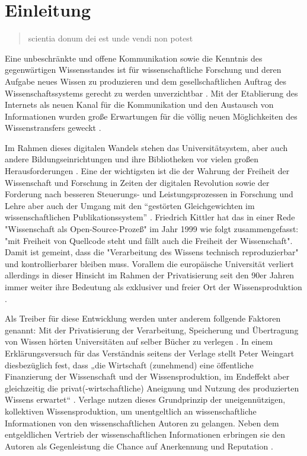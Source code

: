 \chapter{Einleitung} 

\begin{quote}
scientia donum dei est unde vendi non potest
\end{quote}Eine unbeschränkte und offene Kommunikation sowie die Kenntnis des gegenwärtigen Wissensstandes ist für wissenschaftliche Forschung und deren Aufgabe neues Wissen zu produzieren und dem gesellschaftlichen Auftrag des Wissenschaftssystems gerecht zu werden unverzichtbar \cite{Hanekop_2014} \cite{glaeser2006} \cite{gibbons_1994} \cite{Luhmann1998}. Mit der Etablierung des Internets als neuen Kanal für die Kommunikation und den Austausch von Informationen wurden große Erwartungen für die völlig neuen Möglichkeiten des Wissenstransfers geweckt \cite{Hanekop_2014} \cite{albert_2006_open_implications} \cite{Goodrum_2001} \cite{Lawrence_1999}. 

Im Rahmen dieses digitalen Wandels stehen das Universitätsystem, aber auch andere Bildungseinrichtungen und ihre Bibliotheken vor vielen großen Herausforderungen \cite{Harter2006} \cite{Gu_don_2004} \cite{osterloh2008anreize}. Eine der wichtigsten ist die der Wahrung der Freiheit der Wissenschaft und Forschung in Zeiten der digitalen Revolution sowie der Forderung nach besseren Steuerungs- und Leistungsprozessen in Forschung und Lehre \cite{Adler_2009} \cite{gibbons_1994} aber auch der Umgang mit den “gestörten Gleichgewichten im wissenschaftlichen Publikationssystem” \cite{cite:0}. Friedrich Kittler hat das in einer Rede "Wissenschaft als Open-Source-Prozeß" im Jahr 1999 wie folgt zusammengefasst: "mit Freiheit von Quellcode steht und fällt auch die Freiheit der Wissenschaft". Damit ist gemeint, dass die "Verarbeitung des Wissens technisch reproduzierbar" \cite{cite:1} und kontrollierbarer bleiben muss. Vorallem die europäische Universität verliert allerdings in dieser Hinsicht im Rahmen der Privatisierung seit den 90er Jahren immer weiter ihre Bedeutung als exklusiver und freier Ort der Wissensproduktion \cite{suchen}.

Als Treiber für diese Entwicklung werden unter anderem follgende Faktoren genannt: Mit der Privatisierung der Verarbeitung, Speicherung und Übertragung von Wissen hörten Universitäten auf selber Bücher zu verlegen \cite{cite:0}. In einem Erklärungsversuch für das Verständnis seitens der Verlage stellt Peter Weingart diesbezüglich fest, dass „die Wirtschaft (zunehmend) eine öffentliche Finanzierung der Wissenschaft und der Wissensproduktion, im Endeffekt aber gleichzeitig die privat(-wirtschaftliche) Aneignung und Nutzung des produzierten Wissens erwartet“ \cite{cite:2}. Verlage nutzen dieses Grundprinzip der uneigennützigen, kollektiven Wissensproduktion, um unentgeltlich an wissenschaftliche Informationen von den wissenschaftlichen Autoren zu gelangen. Neben dem entgeldlichen Vertrieb der wissenschaftlichen Informationen erbringen sie den Autoren als Gegenleistung die Chance auf Anerkennung und Reputation \cite{cite:21a}. 

